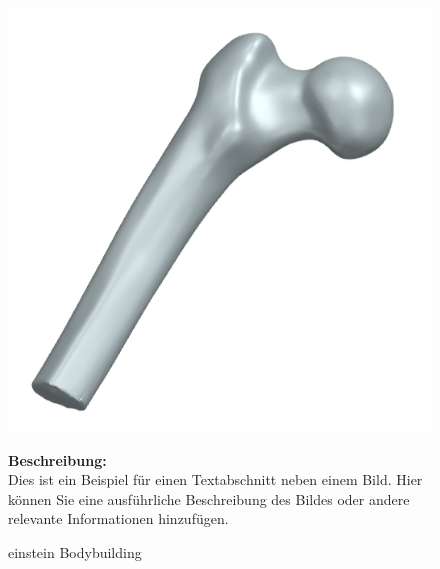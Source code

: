 \begin{figure}[H]
    \centering
    \begin{minipage}{0.4\textwidth}
        \centering
        \includegraphics[width=\textwidth]{abb1/Femur_oben_GOM.png}
        \caption{einstein Bodybuilding}
        \label{fig:bildMitText}
    \end{minipage}
    \hfill
    \begin{minipage}{0.55\textwidth}
        \textbf{Beschreibung:}\\
        Dies ist ein Beispiel für einen Textabschnitt neben einem Bild. Hier können Sie eine ausführliche Beschreibung des Bildes oder andere relevante Informationen hinzufügen.
    \end{minipage}
\end{figure}



